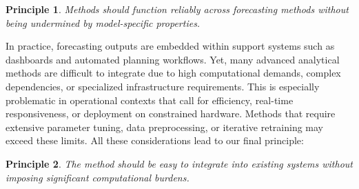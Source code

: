 \documentclass[ijds,sglanonrev]{informs4}
\newtheorem{principle}{Principle}
\begin{document}
\begin{principle}
\textit{Methods should function reliably across forecasting methods without being undermined by model-specific properties.}
\end{principle}

In practice, forecasting outputs are embedded within support systems such as dashboards and automated planning workflows. Yet, many advanced analytical methods are difficult to integrate due to high computational demands, complex dependencies, or specialized infrastructure requirements. This is especially problematic in operational contexts that call for efficiency, real-time responsiveness, or deployment on constrained hardware. Methods that require extensive parameter tuning, data preprocessing, or iterative retraining may exceed these limits. All these considerations lead to our final principle:

\begin{principle}
\textit{The method should be easy to integrate into existing systems without imposing significant computational burdens.}
\end{principle}
\end{document}
